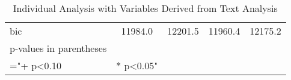 \begin{table}[]
\begin{tabular}{@{}lcccc@{}}
bic                                                    & 11984.0             & 12201.5    & 11960.4    & 12175.2    \\
p-values in parentheses                                &                     &            &            &            \\
="+ p\textless{}0.10                                   & * p\textless{}0.05" &            &            &            \\ \bottomrule
\end{tabular}
\caption{Individual Analysis with Variables Derived from Text Analysis}
\label{reg_ind_withtext_simplified}
\end{table}